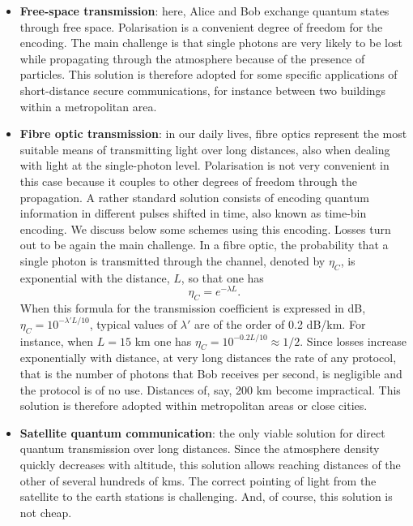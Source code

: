 \documentclass[a4paper]{article}
\begin{document}
\begin{itemize}
\item \textbf{Free-space transmission}: here, Alice and Bob exchange quantum states through free space. Polarisation is a convenient degree of freedom for the encoding. The main challenge is that single photons are very likely to be lost while propagating through the atmosphere because of the presence of particles. This solution is therefore adopted for some specific applications of short-distance secure communications, for instance between two buildings within a metropolitan area. 
\item \textbf{Fibre optic transmission}: in our daily lives, fibre optics represent the most suitable means of transmitting light over long distances, also when dealing with light at the single-photon level. Polarisation is not very convenient in this case because it couples to other degrees of freedom through the propagation. A rather standard solution consists of encoding quantum information in different pulses shifted in time, also known as time-bin encoding. We discuss below some schemes using this encoding. Losses turn out to be again the main challenge. In a fibre optic, the probability that a single photon is transmitted through the channel, denoted by $\eta_C$, is exponential with the distance, $L$, so that one has 
\begin{equation}
\label{channellosses}
\eta_C=e^{-\lambda L} .
\end{equation}
When this formula for the transmission coefficient is expressed in dB, $\eta_C=10^{-\lambda'L/10}$, typical values of $\lambda'$ are of the order of 0.2 dB/km. For instance, when $L=15$ km one has $\eta_C=10^{-0.2L/10}\approx 1/2$. Since losses increase exponentially with distance, at very long distances the rate of any protocol, that is the number of photons that Bob receives per second, is negligible and the protocol is of no use. Distances of, say, 200 km become impractical. This solution is therefore adopted within metropolitan areas or close cities.
\item \textbf{Satellite quantum communication}: the only viable solution for direct quantum transmission over long distances. Since the atmosphere density quickly decreases with altitude, this solution allows reaching distances of the other of several hundreds of kms. The correct pointing of light from the satellite to the earth stations is challenging. And, of course, this solution is not cheap. 
\end{itemize}
\end{document}
